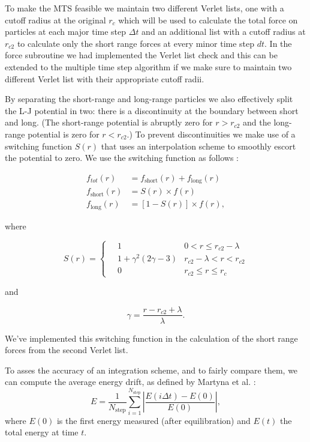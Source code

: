 \documentclass[a4paper]{article}
\begin{document}
To make the MTS feasible we maintain two different Verlet lists, one with a cutoff radius at the
original $r_c$ which will be used to calculate the total force on particles at each major time step
$\Delta t$ and an additional list with a cutoff radius at $r_{c2}$ to calculate only the short range
forces at every minor time step $dt$. In the force subroutine we had implemented the Verlet list
check and this can be extended to the multiple time step algorithm if we make sure to maintain two
different Verlet list with their appropriate cutoff radii.

By separating the short-range and long-range particles we also effectively split the L-J potential
in two: there is a discontinuity at the boundary between short and long. (The short-range potential
is abruptly zero for $r>r_{c2}$ and the long-range potential is zero for $r<r_{c2}$.) To prevent
discontinuities we make use of a switching function $S(r)$ that uses an interpolation scheme to
smoothly escort the potential to zero. We use the switching function as follows \cite{multi}:

\begin{align*}
    f_{tot}(r) &= f_\text{short}(r) + f_\text{long}(r) \\
    f_\text{short}(r) &= S(r) \times f(r) \\
    f_\text{long}(r) &= \left[1-S(r)\right] \times f(r),
\end{align*}

where 

\begin{equation*}
 S(r) =
  \begin{cases}
   \quad 1 &  0 < r \leq r_{c2} - \lambda \\
   \quad 1 + \gamma^2 (2 \gamma - 3) & r_{c2} - \lambda < r < r_{c2} \\
   \quad 0 & r_{c2} \leq r \leq r_c
  \end{cases}
\end{equation*}

and 

\begin{equation*}
    \gamma = \frac{r - r_{c2} + \lambda}{\lambda}.
\end{equation*}

We've implemented this switching function in the calculation of the short range forces from the
second Verlet list.

To asses the accuracy of an integration scheme, and to fairly compare them, we can compute the
average energy drift, as defined by Martyna et al. \cite{multi}:
\begin{equation}
\label{eq:energy_drift}
E = \frac{1}{N_\text{step}} \sum_{i = 1}^{N_\text{step}} \left| \frac{E(i \Delta t) - E(0)}{E(0)} \right|,
\end{equation}
where $E(0)$ is the first energy measured (after equilibration) and $E(t)$ the total energy at time
$t$.
\end{document}
